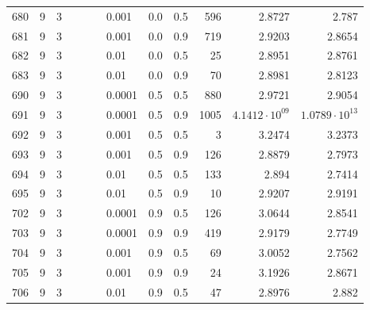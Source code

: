 \begin{longtable}{lrrrrrlrrrrr}
 680 &       9 & 3 &   &   &   &                       0.001 &  0.0 &    0.5 &     596 &                 2.8727 &                  2.787 \\
 681 &       9 & 3 &   &   &   &                       0.001 &  0.0 &    0.9 &     719 &                 2.9203 &                 2.8654 \\
 682 &       9 & 3 &   &   &   &                        0.01 &  0.0 &    0.5 &      25 &                 2.8951 &                 2.8761 \\
 683 &       9 & 3 &   &   &   &                        0.01 &  0.0 &    0.9 &      70 &                 2.8981 &                 2.8123 \\
 690 &       9 & 3 &   &   &   &                      0.0001 &  0.5 &    0.5 &     880 &                 2.9721 &                 2.9054 \\
 691 &       9 & 3 &   &   &   &                      0.0001 &  0.5 &    0.9 &    1005 &  $4.1412\cdot 10^{09}$ &  $1.0789\cdot 10^{13}$ \\
 692 &       9 & 3 &   &   &   &                       0.001 &  0.5 &    0.5 &       3 &                 3.2474 &                 3.2373 \\
 693 &       9 & 3 &   &   &   &                       0.001 &  0.5 &    0.9 &     126 &                 2.8879 &                 2.7973 \\
 694 &       9 & 3 &   &   &   &                        0.01 &  0.5 &    0.5 &     133 &                  2.894 &                 2.7414 \\
 695 &       9 & 3 &   &   &   &                        0.01 &  0.5 &    0.9 &      10 &                 2.9207 &                 2.9191 \\
 702 &       9 & 3 &   &   &   &                      0.0001 &  0.9 &    0.5 &     126 &                 3.0644 &                 2.8541 \\
 703 &       9 & 3 &   &   &   &                      0.0001 &  0.9 &    0.9 &     419 &                 2.9179 &                 2.7749 \\
 704 &       9 & 3 &   &   &   &                       0.001 &  0.9 &    0.5 &      69 &                 3.0052 &                 2.7562 \\
 705 &       9 & 3 &   &   &   &                       0.001 &  0.9 &    0.9 &      24 &                 3.1926 &                 2.8671 \\
 706 &       9 & 3 &   &   &   &                        0.01 &  0.9 &    0.5 &      47 &                 2.8976 &                  2.882 \\

\end{longtable}
